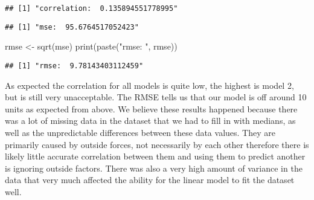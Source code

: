 \documentclass[
]{article}
\newenvironment{Shaded}{\begin{snugshade}}{\end{snugshade}}
\newcommand{\DecValTok}[1]{\textcolor[rgb]{0.00,0.00,0.81}{#1}}
\newcommand{\FunctionTok}[1]{\textcolor[rgb]{0.00,0.00,0.00}{#1}}
\newcommand{\NormalTok}[1]{#1}
\newcommand{\OtherTok}[1]{\textcolor[rgb]{0.56,0.35,0.01}{#1}}
\newcommand{\SpecialCharTok}[1]{\textcolor[rgb]{0.00,0.00,0.00}{#1}}
\newcommand{\StringTok}[1]{\textcolor[rgb]{0.31,0.60,0.02}{#1}}
\begin{document}
\begin{verbatim}
## [1] "correlation:  0.135894551778995"
\end{verbatim}

\begin{Shaded}
\end{Shaded}

\begin{verbatim}
## [1] "mse:  95.6764517052423"
\end{verbatim}

\begin{Shaded}
\begin{Highlighting}[]
\NormalTok{rmse }\OtherTok{\textless{}{-}} \FunctionTok{sqrt}\NormalTok{(mse)}
\FunctionTok{print}\NormalTok{(}\FunctionTok{paste}\NormalTok{(}\StringTok{"rmse: "}\NormalTok{, rmse))}
\end{Highlighting}
\end{Shaded}

\begin{verbatim}
## [1] "rmse:  9.78143403112459"
\end{verbatim}

As expected the correlation for all models is quite low, the highest is
model 2, but is still very unacceptable. The RMSE tells us that our
model is off around 10 units as expected from above. We believe these
results happened because there was a lot of missing data in the dataset
that we had to fill in with medians, as well as the unpredictable
differences between these data values. They are primarily caused by
outside forces, not necessarily by each other therefore there is likely
little accurate correlation between them and using them to predict
another is ignoring outside factors. There was also a very high amount
of variance in the data that very much affected the ability for the
linear model to fit the dataset well.
\end{document}

